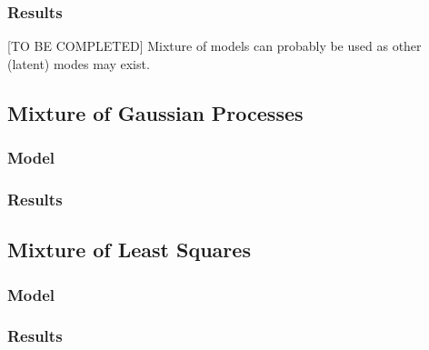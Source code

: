 \documentclass[11pt, oneside]{article}   	%
\begin{document}
        		\subsubsection*{Results}
        			[TO BE COMPLETED] Mixture of models can probably be used as other (latent) modes may exist.
        
         \subsection{Mixture of Gaussian Processes}
         	\subsubsection*{Model}
        		\subsubsection*{Results}
		
         \subsection{Mixture of Least Squares}
         	\subsubsection*{Model}
        		\subsubsection*{Results}    
    
\end{document}
